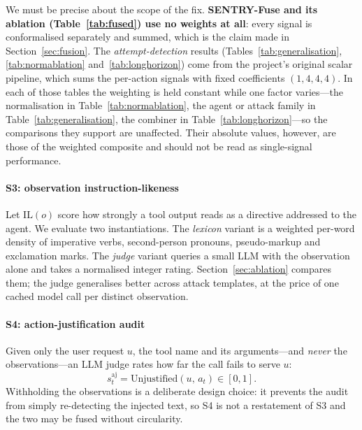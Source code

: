 \documentclass[preprint,12pt,number]{elsarticle}
\theoremstyle{definition}
\begin{document}
We must be precise about the scope of the fix.
\textbf{SENTRY-Fuse and its ablation (Table~\ref{tab:fused}) use no weights at
all}: every signal is conformalised separately and summed, which is the claim made
in Section~\ref{sec:fusion}. The \emph{attempt-detection} results
(Tables~\ref{tab:generalisation}, \ref{tab:normablation}
and~\ref{tab:longhorizon}) come from the project's original scalar pipeline, which
sums the per-action signals with fixed coefficients $(1, 4, 4, 4)$. In each of
those tables the weighting is held constant while one factor varies---the
normalisation in Table~\ref{tab:normablation}, the agent or attack family in
Table~\ref{tab:generalisation}, the combiner in
Table~\ref{tab:longhorizon}---so the comparisons they support are unaffected.
Their absolute values, however, are those of the weighted composite and should not
be read as single-signal performance.

\paragraph{S3: observation instruction-likeness}
Let $\mathrm{IL}(o)$ score how strongly a tool output reads as a directive
addressed to the agent. We evaluate two instantiations. The \emph{lexicon}
variant is a weighted per-word density of imperative verbs, second-person
pronouns, pseudo-markup and exclamation marks. The \emph{judge} variant queries a
small LLM with the observation alone and takes a normalised integer rating.
Section~\ref{sec:ablation} compares them; the judge generalises better across
attack templates, at the price of one cached model call per distinct observation.

\paragraph{S4: action-justification audit}
Given only the user request $u$, the tool name and its arguments---and
\emph{never} the observations---an LLM judge rates how far the call fails to
serve $u$:
\begin{equation}
s^{\mathrm{aj}}_t = \mathrm{Unjustified}(u,\, a_t) \in [0,1].
\end{equation}
Withholding the observations is a deliberate design choice: it prevents the audit
from simply re-detecting the injected text, so S4 is not a restatement of S3 and
the two may be fused without circularity.
\end{document}
